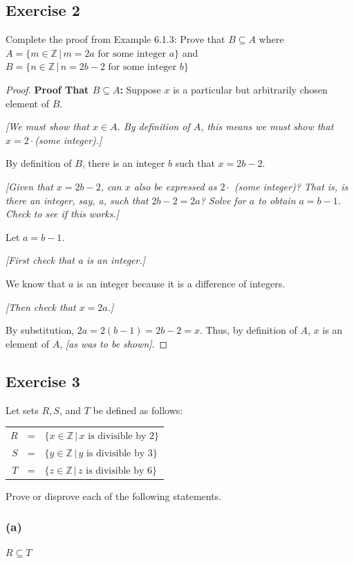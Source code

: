 \documentclass[14pt]{extarticle}
\newcommand{\Z}{\mathbb{Z}}
\begin{document}
\subsection{Exercise 2}
Complete the proof from Example 6.1.3: 
Prove that \(B \subseteq A\) where \(A = \{m \in \Z \, | \, m = 2a \text{ for some integer } a\}\) and 
\(B = \{n \in \Z \, | \, n = 2b - 2 \text{ for some integer } b\}\)

\begin{proof}
{\bf Proof That $B \subseteq A$:} Suppose $x$ is a particular but arbitrarily chosen element of $B$. 

{\it [We must show that $x \in A$. By definition of $A$, this means we must show that $x = 2 \cdot$(some integer).]}

By definition of $B$, there is an integer $b$ such that \(x = 2b - 2\). 

{\it [Given that \(x = 2b - 2\), can $x$ also be expressed as $2 \cdot$ (some integer)? That is, is there an integer, say, a, such that \(2b - 2 = 2a\)? Solve for $a$ to obtain \(a = b - 1\). Check to see if this works.]}

Let \(a = b - 1\). 

{\it [First check that a is an integer.]} 

We know that $a$ is an integer because it is a difference of integers. 

{\it [Then check that \(x = 2a\).]}

By substitution, \(2a = 2(b - 1) = 2b - 2 = x\). Thus, by 
definition of $A$, $x$ is an element of $A$, {\it [as was to be shown]}.
\end{proof}

\subsection{Exercise 3}
Let sets $R, S$, and $T$ be defined as follows:
\begin{center}
\begin{tabular}{rcl}
$R$ & = & \(\{x \in \Z \, | \, x \text{ is divisible by 2} \}\) \\
$S$ & = & \(\{y \in \Z \, | \, y \text{ is divisible by 3} \}\) \\
$T$ & = & \(\{z \in \Z \, | \, z \text{ is divisible by 6} \}\)
\end{tabular}
\end{center}
Prove or disprove each of the following statements.

\subsubsection{(a)}
\(R \subseteq T\)
\end{document}
